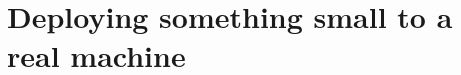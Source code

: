 \chapter{Deploying something small to a real machine}
\label{ch:deploying-something-small-to-a-real}

